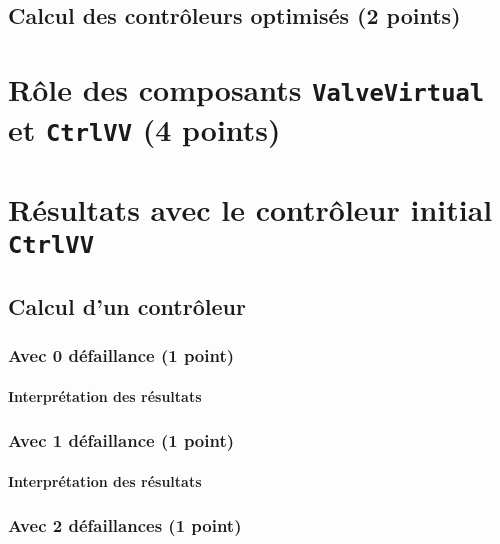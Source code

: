 \documentclass[a4paper]{book}
\begin{document}
\subsection{Calcul des contrôleurs optimisés (2 points)}


\section{Rôle des composants {\tt ValveVirtual} et {\tt CtrlVV} (4 points)}

\section{Résultats avec le contrôleur initial {\tt CtrlVV}}
\subsection{Calcul d'un contrôleur}
\subsubsection{Avec 0 défaillance (1 point)}


%
%
%
\paragraph{Interprétation des résultats}

\subsubsection{Avec 1 défaillance (1 point)}


%
%
%
\paragraph{Interprétation des résultats}

\subsubsection{Avec 2 défaillances (1 point)}


%
%
%
\end{document}
